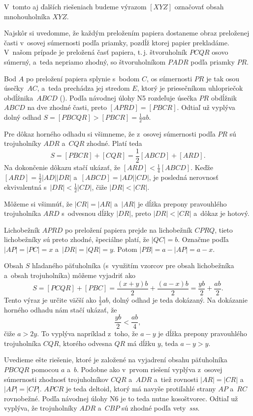 {%
V~tomto aj ďalších riešeniach budeme výrazom $[XYZ]$ označovať obsah mnohouholníka $XYZ$.

Najskôr si uvedomme, že každým preložením papiera dostaneme obraz preloženej časti v~osovej súmernosti podľa priamky, pozdĺž ktorej papier prekladáme.
V~našom prípade je preložená časť papiera, t.\,j. štvoruholník $PCQR$ osovo súmerný, a~teda nepriamo zhodný, so štvoruholníkom $PADR$
podľa priamky $PR$.
%

Bod $A$ po preložení papiera splynie s~bodom $C$, os súmernosti $PR$ je tak osou úsečky~$AC$, a~teda prechádza jej stredom $E$, ktorý je priesečníkom uhlopriečok obdĺžnika~$ABCD$ (\obr). Podľa návodnej úlohy N5 rozdeľuje úsečka $PR$ obdĺžnik $ABCD$ na dve zhodné časti, preto $[APRD]=[PBCR]$.
Odtiaľ už vyplýva dolný odhad $S=[PBCQR]>[PBCR]=\frac12 ab$.

Pre dôkaz horného odhadu si všimneme, že z~osovej súmernosti podľa $PR$ sú trojuholníky $ADR$ a~$CQR$ zhodné.
Platí teda
$$
S=[PBCR]+[CQR]=\frac12[ABCD]+[ARD].
$$
Na dokončenie dôkazu stačí ukázať, že $[ARD]<\frac14[ABCD]$.
Keďže $[ARD]=\frac12|AD||DR|$ a~$[ABCD]=|AD||CD|$, je posledná nerovnosť ekvivalentná s~$|DR|<\frac12|CD|$, čiže $|DR|<|CR|$.

Môžeme si všimnúť, že $|CR|=|AR|$ a~$|AR|$ je dĺžka prepony pravouhlého trojuholníka $ARD$ s~odvesnou dĺžky $|DR|$, preto $|DR|<|CR|$ a~dôkaz je hotový.

\ineriesenie
Lichobežník $APRD$ po preložení papiera prejde na lichobežník $CPRQ$, tieto lichobežníky sú preto zhodné, špeciálne platí, že $|QC|=b$.
Označme podľa \obr{} $|AP| = |PC| = x $ a~$|DR| = |QR| = y$. Potom $|PB| = a-|AP| = a-x$.
%

Obsah $S$ hľadaného päťuholníka (s~využitím vzorcov pre obsah lichobežníka a~obsah trojuholníka) môžeme vyjadriť ako
$$S=[PCQR]+[PBC]=\frac{(x+y)b}{2} + \frac{(a-x)b}{2} = \frac{yb}{2} + \frac{ ab}{2}.$$
Tento výraz je určite väčší ako $\frac12{ab}$, dolný odhad je teda dokázaný.
Na dokázanie horného odhadu nám stačí ukázať, že
$$\frac{yb}{2} < \frac{ab}{4},$$
čiže $a>2y. $ To vyplýva napríklad z~toho,
že $a-y$ je dĺžka prepony pravouhlého trojuholníka $CQR$, ktorého odvesna $QR$ má dĺžku $y$, teda $a-y>y$.
%

\ineriesenie
Uvedieme ešte riešenie, ktoré je založené na vyjadrení obsahu päťuholníka $PBCQR$ pomocou $a$ a~$b$.
Podobne ako v~prvom riešení vyplýva z~osovej súmernosti zhodnosť trojuholníkov $CQR$ a~$ADR$ a~tiež rovnosti
$|AR|=|CR|$ a~$|AP|=|CP|$. $APCR$ je teda deltoid, ktorý má navyše protiľahlé strany $AP$ a~$RC$ rovnobežné. Podľa návodnej úlohy N6 je to teda nutne kosoštvorec. Odtiaľ už vyplýva, že trojuholníky $ADR$ a~$CBP$ sú zhodné podľa vety~{\it sss}.

}
